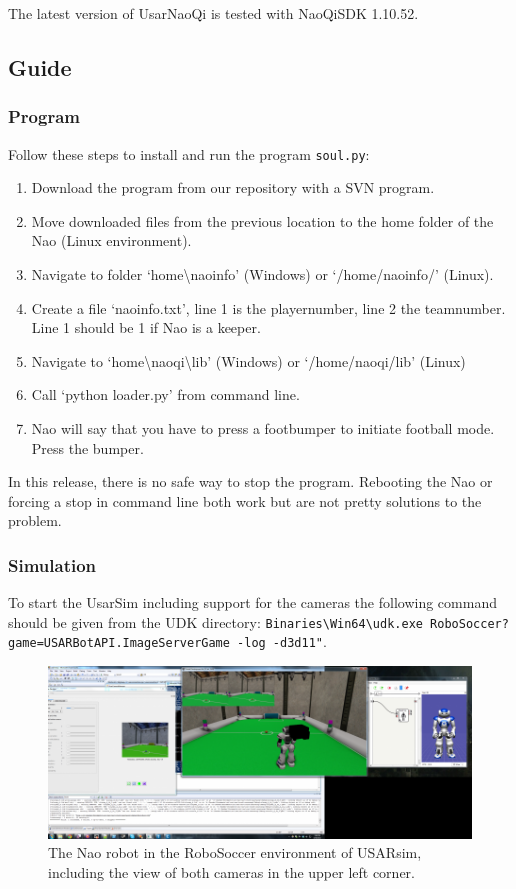 \documentclass[11pt,a4paper,oneside]{article}
\begin{document}
The latest version of UsarNaoQi is tested with NaoQiSDK 1.10.52.

\subsection{Guide}
\subsubsection{Program}
Follow these steps to install and run the program \texttt{soul.py}:
\begin{enumerate}
\item Download the program from our repository with a SVN program.
\item Move downloaded files from the previous location to the home folder of the Nao (Linux environment).
\item Navigate to folder `home\textbackslash naoinfo' (Windows) or `/home/naoinfo/' (Linux). 
\item Create a file `naoinfo.txt', line 1 is the playernumber, line 2 the teamnumber. Line 1 should be 1 if Nao is a keeper.
\item Navigate to `home\textbackslash naoqi\textbackslash lib' (Windows) or `/home/naoqi/lib' (Linux)
\item Call `python loader.py' from command line.
\item Nao will say that you have to press a footbumper to initiate football mode. Press the bumper.
\end{enumerate}
In this release, there is no safe way to stop the program. Rebooting the Nao or forcing a stop in command line both work but are not pretty solutions to the problem.

\subsubsection{Simulation}
To start the UsarSim including support for the cameras the following command should be given from the UDK directory: \texttt{Binaries\textbackslash Win64\textbackslash udk.exe RoboSoccer?game=USARBotAPI.ImageServerGame -log -d3d11"}.

\begin{figure}[htb]        
\centering\includegraphics[width=.95\columnwidth]{NaoWithTwoCamerasInSoccerWorld.png}
\caption{The  Nao robot in the RoboSoccer environment of USARsim, including the view of both cameras in the upper left corner.}\label{fig:nao_robosoccer}
\end{figure}
\end{document}
